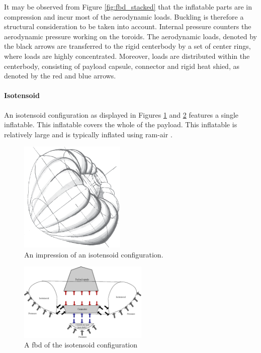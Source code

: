 It may be observed from Figure  \ref{fig:fbd_stacked} that the inflatable parts are in compression and incur most of the aerodynamic loads. Buckling is therefore a structural consideration to be taken into account. Internal pressure counters the aerodynamic pressure working on the toroids. The aerodynamic loads, denoted by the black arrows are transferred to the rigid centerbody by a set of center rings, where loads are highly concentrated. Moreover, loads are distributed within the centerbody, consisting of payload capsule, connector and rigid heat shied, as denoted by the red and blue arrows.


\paragraph{Isotensoid}

An isotensoid configuration as displayed in Figures \ref{fig:conc_iso} and \ref{fig:fbd_iso} features a single inflatable. This inflatable covers the whole of the payload. This inflatable is relatively large and is typically inflated using ram-air \cite{Smith2011}. 

\begin{figure}[H]
\centering
\includegraphics[width = 0.45\textwidth]{Figure/isotensoid.eps}

\caption{An impression of an isotensoid configuration.}

\label{fig:conc_iso}
\end{figure}

\begin{figure}[H]
\centering
\includegraphics[width = 0.55\textwidth]{Figure/FBD_isotensoid.eps}
\caption{A \gls{fbd} of the isotensoid configuration}
\label{fig:fbd_iso}
\end{figure}

